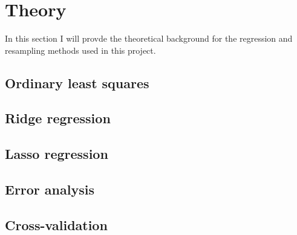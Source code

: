 \section{Theory}

In this section I will provde the theoretical background for the regression and
resampling methods used in this project.

\subsection{Ordinary least squares}



\subsection{Ridge regression}


\subsection{Lasso regression}


\subsection{Error analysis}



\subsection{Cross-validation}
